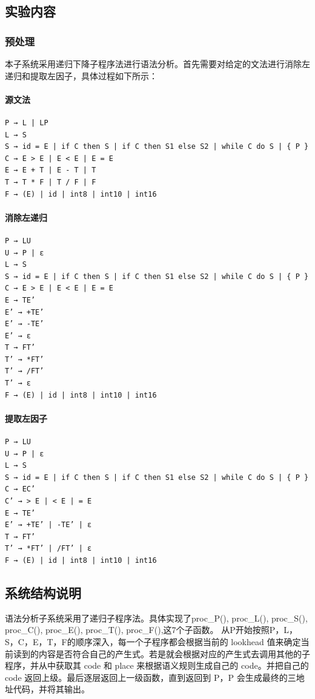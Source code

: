 \documentclass{ctexrep}
\begin{document}
\subsection{实验内容}
\subsubsection{预处理}
本子系统采用递归下降子程序法进行语法分析。首先需要对给定的文法进行消除左递归和提取左因子，具体过程如下所示：
\paragraph{源文法}
\begin{verbatim}
P → L | LP
L → S 
S → id = E | if C then S | if C then S1 else S2 | while C do S | { P }
C → E > E | E < E | E = E
E → E + T | E - T | T
T → T * F | T / F | F
F → (E) | id | int8 | int10 | int16    
\end{verbatim}
\paragraph{消除左递归}
\begin{verbatim}
P → LU
U → P | ε
L → S 
S → id = E | if C then S | if C then S1 else S2 | while C do S | { P }
C → E > E | E < E | E = E
E → TE’
E’ → +TE’
E’ → -TE’
E’ → ε
T → FT’
T’ → *FT’
T’ → /FT’
T’ → ε
F → (E) | id | int8 | int10 | int16    
\end{verbatim}
\paragraph{提取左因子}
\begin{verbatim}
P → LU
U → P | ε
L → S 
S → id = E | if C then S | if C then S1 else S2 | while C do S | { P }
C → EC’
C’ → > E | < E | = E
E → TE’
E’ → +TE’ | -TE’ | ε
T → FT’
T’ → *FT’ | /FT’ | ε
F → (E) | id | int8 | int10 | int16    
\end{verbatim}
\subsection{系统结构说明}

语法分析子系统采用了递归子程序法。具体实现了proc\_P(), proc\_L(), proc\_S(), proc\_C(), proc\_E(), proc\_T(), proc\_F(),这7个子函数。
从P开始按照P，L，S，C，E，T，F的顺序深入，每一个子程序都会根据当前的 lookhead 值来确定当前读到的内容是否符合自己的产生式。若是就会根据对应的产生式去调用其他的子程序，并从中获取其 code 和 place 来根据语义规则生成自己的 code。并把自己的 code 返回上级。最后逐层返回上一级函数，直到返回到 P，P 会生成最终的三地址代码，并将其输出。
\end{document}
